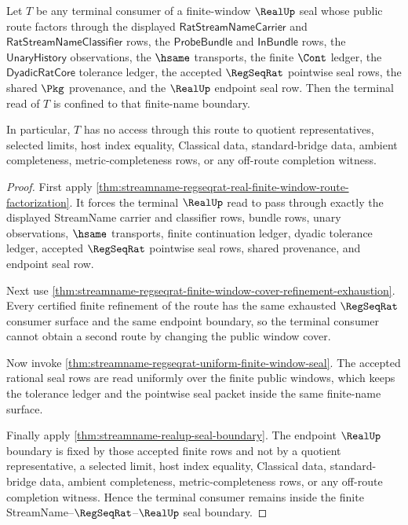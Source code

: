 \begin{theorem}
\label{thm:streamname-regseqrat-real-finite-route-terminal-nonescape}
Let $T$ be any terminal consumer of a finite-window $\RealUp$ seal whose public
route factors through the displayed $\mathsf{RatStreamNameCarrier}$ and
$\mathsf{RatStreamNameClassifier}$ rows, the $\mathsf{ProbeBundle}$ and
$\mathsf{InBundle}$ rows, the $\mathsf{UnaryHistory}$ observations, the
$\hsame$ transports, the finite $\Cont$ ledger, the
$\mathsf{DyadicRatCore}$ tolerance ledger, the accepted $\RegSeqRat$ pointwise
seal rows, the shared $\Pkg$ provenance, and the $\RealUp$ endpoint seal row.
Then the terminal read of $T$ is confined to that finite-name boundary.

In particular, $T$ has no access through this route to quotient
representatives, selected limits, host index equality, Classical data,
standard-bridge data, ambient completeness, metric-completeness rows, or any
off-route completion witness.
\end{theorem}
\begin{proof}
First apply
\autoref{thm:streamname-regseqrat-real-finite-window-route-factorization}. It
forces the terminal $\RealUp$ read to pass through exactly the displayed
StreamName carrier and classifier rows, bundle rows, unary observations,
$\hsame$ transports, finite continuation ledger, dyadic tolerance ledger,
accepted $\RegSeqRat$ pointwise seal rows, shared provenance, and endpoint seal
row.

Next use
\autoref{thm:streamname-regseqrat-finite-window-cover-refinement-exhaustion}.
Every certified finite refinement of the route has the same exhausted
$\RegSeqRat$ consumer surface and the same endpoint boundary, so the terminal
consumer cannot obtain a second route by changing the public window cover.

Now invoke \autoref{thm:streamname-regseqrat-uniform-finite-window-seal}. The
accepted rational seal rows are read uniformly over the finite public windows,
which keeps the tolerance ledger and the pointwise seal packet inside the same
finite-name surface.

Finally apply \autoref{thm:streamname-realup-seal-boundary}. The endpoint
$\RealUp$ boundary is fixed by those accepted finite rows and not by a quotient
representative, a selected limit, host index equality, Classical data,
standard-bridge data, ambient completeness, metric-completeness rows, or any
off-route completion witness. Hence the terminal consumer remains inside the
finite StreamName--$\RegSeqRat$--$\RealUp$ seal boundary.
\end{proof}

